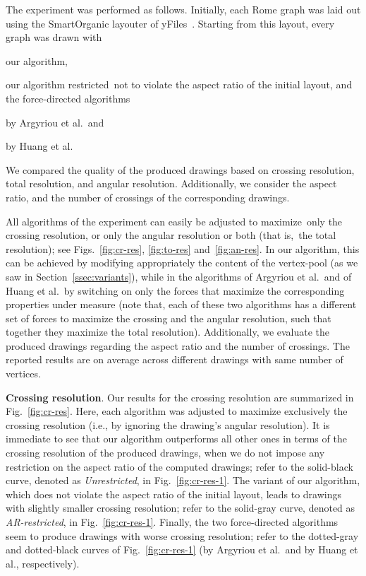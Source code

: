 \documentclass[runningheads]{llncs}
\newcommand{\myparagraph}[1]{\smallskip\noindent\textbf{#1}.}
\begin{document}
The experiment was performed as follows. Initially, each Rome graph was laid out using the SmartOrganic layouter of yFiles~\cite{DBLP:books/sp/04/WieseE004}. Starting from this layout, every graph was drawn with
\begin{inparaenum}[(i)]
\item our algorithm,
\item our algorithm restricted~not to violate the aspect ratio of the initial layout, and the force-directed algorithms
\item by Argyriou et al.\ and
\item by Huang et al.
\end{inparaenum}

We compared the quality of the produced drawings based on crossing resolution, total resolution, and angular resolution. Additionally, we consider the aspect ratio, and the number of crossings of the corresponding drawings.

All algorithms of the experiment can easily be adjusted to maximize~only the crossing resolution, or only the angular resolution or both (that is,~the total resolution); see Figs.~\ref{fig:cr-res}, \ref{fig:to-res} and~\ref{fig:an-res}. In our algorithm, this can be achieved by modifying appropriately the content of the vertex-pool (as we saw in Section~\ref{ssec:variants}), while in the algorithms of Argyriou et al.\ and of Huang et al.\ by switching on only the forces that maximize the corresponding properties under measure (note that, each of these two algorithms has a different set of forces to maximize the crossing and the angular resolution, such that together they maximize the total resolution). Additionally, we evaluate the produced drawings regarding the aspect ratio and the number of crossings. The reported results are on average across different drawings with same number of vertices.

\myparagraph{Crossing resolution} Our results for the crossing resolution are summarized in Fig.~\ref{fig:cr-res}. Here, each algorithm was adjusted to maximize exclusively the crossing resolution (i.e., by ignoring the drawing's angular resolution). It is immediate to see that our algorithm outperforms all other ones in terms of the crossing resolution of the produced drawings, when we do not impose any restriction on the aspect ratio of the computed drawings; refer to the solid-black curve, denoted as \emph{Unrestricted}, in Fig.~\ref{fig:cr-res-1}. The variant of our algorithm, which does not violate the aspect ratio of the initial layout, leads to drawings with slightly smaller crossing resolution; refer to the solid-gray curve, denoted as \emph{AR-restricted}, in Fig.~\ref{fig:cr-res-1}. Finally, the two force-directed algorithms seem to produce drawings with worse crossing resolution; refer to the dotted-gray and dotted-black curves of Fig.~\ref{fig:cr-res-1} (by Argyriou et al.\ and by Huang et al., respectively).
\end{document}

